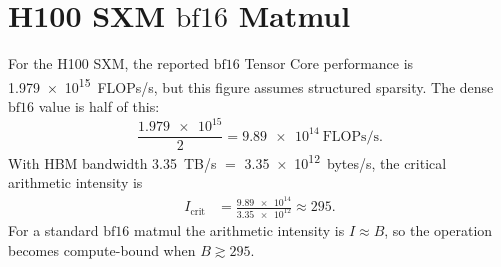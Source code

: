 \documentclass[11pt]{article}
\newcommand{\dtype}[1]{\mathrm{#1}}          %
\newcommand{\Icrit}{I_{\text{crit}}}
\begin{document}
\section{H100 SXM \texorpdfstring{\(\dtype{bf16}\)}{bf16} Matmul}

For the H100 SXM, the reported \(\dtype{bf16}\) Tensor Core performance is
\num{1.979e15}~FLOPs/s, but this figure assumes structured sparsity. The dense
\(\dtype{bf16}\) value is half of this:
\[
\frac{\num{1.979e15}}{2} = \num{9.89e14}~\text{FLOPs/s}.
\]
With HBM bandwidth \qty{3.35}{TB/s} \(=\) \num{3.35e12}~bytes/s, the critical
arithmetic intensity is
\begin{align}
\Icrit
&= \frac{\num{9.89e14}}{\num{3.35e12}}
   \approx 295.
\end{align}
For a standard \(\dtype{bf16}\) matmul the arithmetic intensity is
\(I \approx B\), so the operation becomes compute-bound when \(B \gtrsim 295\).
\end{document}
